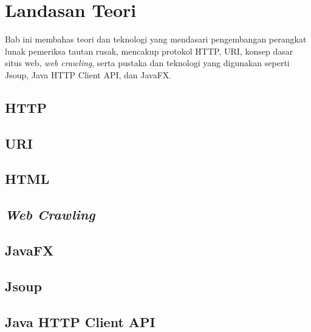 \chapter{Landasan Teori}
\label{chap:landasan-teori}
Bab ini membahas teori dan teknologi yang mendasari pengembangan perangkat lunak pemeriksa tautan rusak, mencakup protokol HTTP, URI, konsep dasar situs web, \textit{web crawling}, serta pustaka dan teknologi yang digunakan seperti Jsoup, Java HTTP Client API, dan JavaFX.

\section{HTTP~\cite{RFC9110}}
\label{sec:02-http}



\section{URI~\cite{RFC3986}}
\label{sec:02-uri}



\section{HTML~\cite{powell:10:htmlcss}}
\label{sec:02-html}



\section{\textit{Web Crawling}~\cite{liu:11:webdatamining}}
\label{sec:02-web-crawling}



\section{JavaFX~\cite{sharan:22:learnjavafx17}}
\label{sec:02-javafx}



\section{Jsoup}
\label{sec:02-jsoup}



\section{Java HTTP Client API}
\label{sec:02-java-http-client-api}



